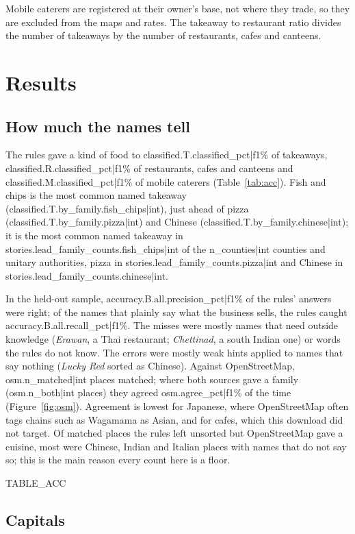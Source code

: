 \documentclass[11pt,a4paper]{article}
\begin{document}
Mobile caterers are registered at their owner's base, not where they trade, so they are excluded from the maps and rates. The takeaway to restaurant ratio divides the number of takeaways by the number of restaurants, cafes and canteens.

\section{Results}

\subsection{How much the names tell}

The rules gave a kind of food to {{classified.T.classified_pct|f1}}\% of takeaways, {{classified.R.classified_pct|f1}}\% of restaurants, cafes and canteens and {{classified.M.classified_pct|f1}}\% of mobile caterers (Table~\ref{tab:acc}). Fish and chips is the most common named takeaway ({{classified.T.by_family.fish_chips|int}}), just ahead of pizza ({{classified.T.by_family.pizza|int}}) and Chinese ({{classified.T.by_family.chinese|int}}); it is the most common named takeaway in {{stories.lead_family_counts.fish_chips|int}} of the {{n_counties|int}} counties and unitary authorities, pizza in {{stories.lead_family_counts.pizza|int}} and Chinese in {{stories.lead_family_counts.chinese|int}}.

In the held-out sample, {{accuracy.B.all.precision_pct|f1}}\% of the rules' answers were right; of the names that plainly say what the business sells, the rules caught {{accuracy.B.all.recall_pct|f1}}\%. The misses were mostly names that need outside knowledge (\textit{Erawan}, a Thai restaurant; \textit{Chettinad}, a south Indian one) or words the rules do not know. The errors were mostly weak hints applied to names that say nothing (\textit{Lucky Red} sorted as Chinese). Against OpenStreetMap, {{osm.n_matched|int}} places matched; where both sources gave a family ({{osm.n_both|int}} places) they agreed {{osm.agree_pct|f1}}\% of the time (Figure~\ref{fig:osm}). Agreement is lowest for Japanese, where OpenStreetMap often tags chains such as Wagamama as Asian, and for cafes, which this download did not target. Of matched places the rules left unsorted but OpenStreetMap gave a cuisine, most were Chinese, Indian and Italian places with names that do not say so; this is the main reason every count here is a floor.

{{TABLE_ACC}}

\subsection{Capitals}
\end{document}
